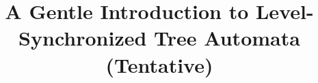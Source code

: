 \documentclass{llncs}
\title{A Gentle Introduction to Level-Synchronized Tree Automata (Tentative)}
\begin{document}
\maketitle


\begin{abstract}

\end{abstract}




\end{document}
